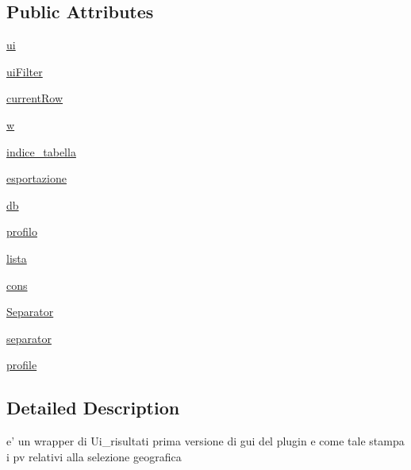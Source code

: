 \subsection*{Public Attributes}
\begin{DoxyCompactItemize}
\item 
\hyperlink{classmmasgis_1_1risultati_1_1testDialog_af883d2bb6a1553330fa6970762ea66cb}{ui}
\item 
\hyperlink{classmmasgis_1_1risultati_1_1testDialog_aedd9ffe8c7405d1ea36d0ae88f09da50}{uiFilter}
\item 
\hyperlink{classmmasgis_1_1risultati_1_1testDialog_a6d5317b83b02d82c81dfd64b6c3c546e}{currentRow}
\item 
\hyperlink{classmmasgis_1_1risultati_1_1testDialog_a9d885f43e0848adc8dcf0d51435444fb}{w}
\item 
\hyperlink{classmmasgis_1_1risultati_1_1testDialog_aea19acdb700a3a37d78d353e36475d00}{indice\_\-tabella}
\item 
\hyperlink{classmmasgis_1_1risultati_1_1testDialog_a77cbad37d8c476d326d26fcb0acebcd2}{esportazione}
\item 
\hyperlink{classmmasgis_1_1risultati_1_1testDialog_ac2a3fca3bfc2ea28e4b842ea13232188}{db}
\item 
\hyperlink{classmmasgis_1_1risultati_1_1testDialog_ab9843661cdf52cce37cd55595694dfcd}{profilo}
\item 
\hyperlink{classmmasgis_1_1risultati_1_1testDialog_a11f9134fb3f7636d4e5f8f73795a2488}{lista}
\item 
\hyperlink{classmmasgis_1_1risultati_1_1testDialog_a39d6182b597f7e70a7d7ddae9e801056}{cons}
\item 
\hyperlink{classmmasgis_1_1risultati_1_1testDialog_a45d04b4164c0a8e2b944755a433a7581}{Separator}
\item 
\hyperlink{classmmasgis_1_1risultati_1_1testDialog_a23f08b517ab809995460a6e0f3866fb2}{separator}
\item 
\hyperlink{classmmasgis_1_1risultati_1_1testDialog_a7cef9b0cf05a04f1971ada0c6c745059}{profile}
\end{DoxyCompactItemize}


\subsection{Detailed Description}
\begin{DoxyVerb}
e' un wrapper di Ui_risultati
prima versione di gui del plugin
e come tale stampa i pv relativi alla selezione geografica
\end{DoxyVerb}
 

